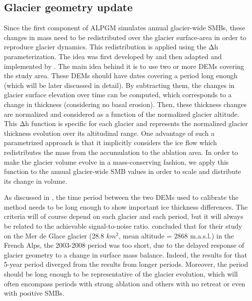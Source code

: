 \subsection{Glacier geometry update} \label{methods:methods:deltah}

Since the first component of ALPGM simulates annual glacier-wide SMBs, these changes in mass need to be redistributed over the glacier surface-area in order to reproduce glacier dynamics. This redistribution is applied using the Δh parameterization. The idea was first developed by \citet{johannesson_timescale_1989} and then adapted and implemented by \citet{huss_modelling_2008}. The main idea behind it is to use two or more DEMs covering the study area. These DEMs should have dates covering a period long enough (which will be later discussed in detail). By subtracting them, the changes in glacier surface elevation over time can be computed, which corresponds to a change in thickness (considering no basal erosion). Then, these thickness changes are normalized and considered as a function of the normalized glacier altitude. This Δh function is specific for each glacier and represents the normalized glacier thickness evolution over its altitudinal range. One advantage of such a parametrized approach is that it implicitly considers the ice flow which redistributes the mass from the accumulation to the ablation area. In order to make the glacier volume evolve in a mass-conserving fashion, we apply this function to the annual glacier-wide SMB values in order to scale and distribute its change in volume. 

As discussed in \citet{vincent_future_2014}, the time period between the two DEMs used to calibrate the method needs to be long enough to show important ice thickness differences. The criteria will of course depend on each glacier and each period, but it will always be related to the achievable signal-to-noise ratio. \citet{vincent_future_2014} concluded that for their study on the Mer de Glace glacier (28.8 \(km^2\), mean altitude = 2868 m.a.s.l.) in the French Alps, the 2003-2008 period was too short, due to the delayed response of glacier geometry to a change in surface mass balance. Indeed, the results for that 5-year period diverged from the results from longer periods. Moreover, the period should be long enough to be representative of the glacier evolution, which will often encompass periods with strong ablation and others with no retreat or even with positive SMBs. 

